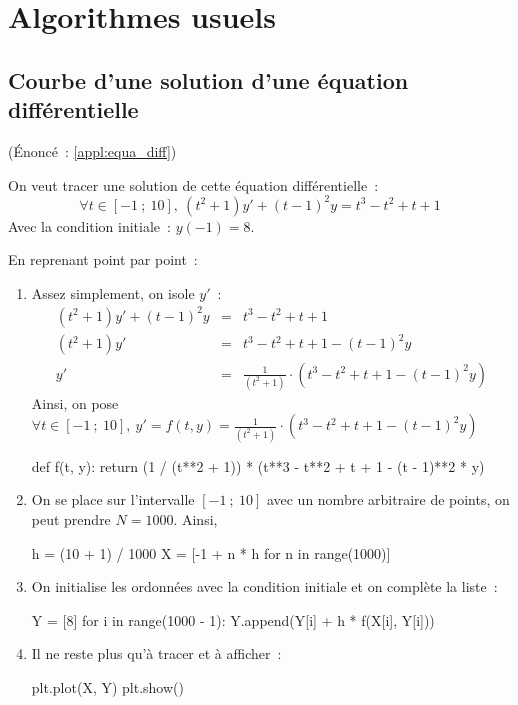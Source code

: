 \section{Algorithmes usuels}
	
	\subsection{Courbe d'une solution d'une équation différentielle} \label{corr:equa_diff} (Énoncé~: \ref{appl:equa_diff})
		
		On veut tracer une solution de cette équation différentielle~:
		\[
			\forall t \in [-1~;\ 10],\ (t^2 + 1)y' + (t - 1)^2y = t^3 - t^2 + t + 1
		\]
		Avec la condition initiale~: $y(-1) = 8$.
		
		En reprenant point par point~:
		\begin{enumerate}
			\item Assez simplement, on isole $y'$~:
			\[ \begin{array}{rll}
				(t^2 + 1)y' + (t - 1)^2y & = & t^3 - t^2 + t + 1 \\
				(t^2 + 1)y' & = & t^3 - t^2 + t + 1 - (t - 1)^2y \\
				y' & = & \frac{1}{(t^2 + 1)} \cdot (t^3 - t^2 + t + 1 - (t - 1)^2y)
			\end{array} \]
			Ainsi, on pose $\forall t \in [-1~;\ 10],\ y' = f(t, y) = \frac{1}{(t^2 + 1)} \cdot (t^3 - t^2 + t + 1 - (t - 1)^2y)$
			\begin{pythoncode}
				def f(t, y):
					return (1 / (t**2 + 1)) * (t**3 - t**2 + t + 1 - (t - 1)**2 * y)
			\end{pythoncode}
			
			\item On se place sur l'intervalle $[-1~;\ 10]$ avec un nombre arbitraire de points, on peut prendre $N = 1000$. Ainsi,
			\begin{pythoncode}
				h = (10 + 1) / 1000
				X = [-1 + n * h for n in range(1000)]
			\end{pythoncode}
			
			\item On initialise les ordonnées avec la condition initiale et on complète la liste~:
			\begin{pythoncode}
				Y = [8]
				for i in range(1000 - 1):
					Y.append(Y[i] + h * f(X[i], Y[i]))
			\end{pythoncode}
			
			\item Il ne reste plus qu'à tracer et à afficher~:
			\begin{pythoncode}
				plt.plot(X, Y)
				plt.show()
			\end{pythoncode}
		\end{enumerate}
	
